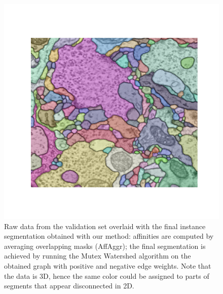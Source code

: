 \begin{figure}[t]
\centering
        \includegraphics[width=\textwidth,trim=1.80in 1.4in 1.8in 1.50in,clip]{./figs/MWS_segm.pdf} %
        \caption{Raw data from the validation set overlaid with the final instance segmentation obtained with our method: affinities are computed by averaging overlapping masks (AffAggr); the final segmentation is achieved by running the Mutex Watershed algorithm on the obtained graph with positive and negative edge weights. Note that the data is 3D, hence the same color could be assigned to parts of segments that appear disconnected in 2D.}
    \label{fig:MWS_segm}
\end{figure}


